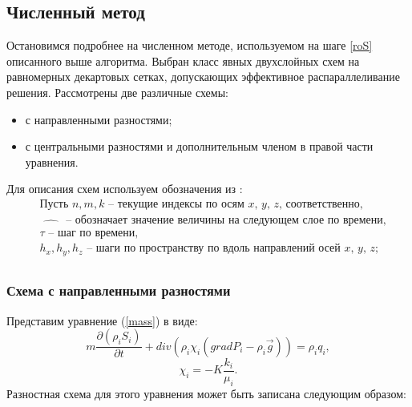 \subsection{Численный метод}
Остановимся подробнее на численном методе, используемом на шаге \ref{roS}
описанного выше алгоритма. Выбран класс явных двухслойных схем
на равномерных декартовых сетках,
допускающих эффективное распараллеливание решения.
Рассмотрены две различные схемы:
\begin{itemize}
\item с направленными разностями;
\item с центральными разностями и дополнительным членом в правой части уравнения.
\end{itemize}
Для описания схем используем обозначения из \cite{Kalitkin}:
\begin{equation*}
  \begin{aligned}
    &\text{Пусть } n, m, k \text{ -- текущие индексы по осям $x$, $y$, $z$, соответственно,}\\
    &\widehat{\qquad} \text{ -- обозначает значение величины на следующем слое по времени,}\\
    &\tau \text{ -- шаг по времени,}\\
    &h_x, h_y, h_z \text{ -- шаги по пространству по 
    вдоль направлений осей $x$, $y$, $z$};\\
  \end{aligned}
\end{equation*}


\subsubsection*{Схема с направленными разностями}
Представим уравнение (\ref{mass}) в виде:
 \begin{equation}
 	 m \frac{\partial (\rho_i S_i)}{\partial t}+ div(\rho_i \chi_i (grad P_i - {\rho}_i\overrightarrow{g})) = \rho_i q_i,
 \end{equation}
 $$\chi_i=-K\frac{k_i}{\mu_i}.$$
Разностная схема для этого уравнения может быть записана следующим
образом:

